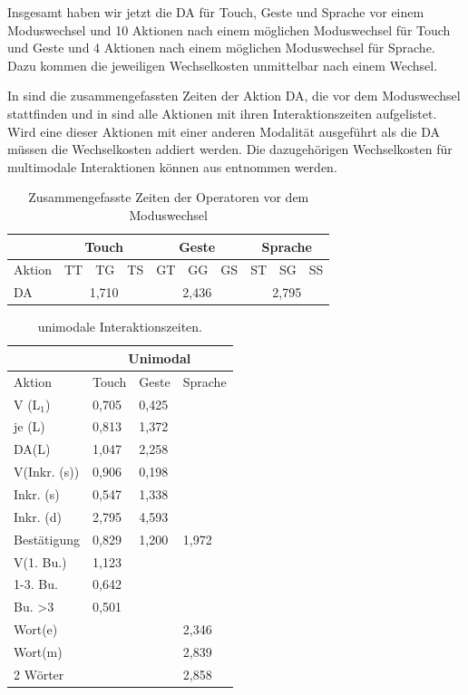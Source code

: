 Insgesamt haben wir jetzt die DA für Touch, Geste und Sprache vor einem Moduswechsel und 10 Aktionen nach einem möglichen Moduswechsel für Touch und Geste und 4 Aktionen nach einem möglichen Moduswechsel für Sprache. Dazu kommen die jeweiligen Wechselkosten unmittelbar nach einem Wechsel.

In  sind die zusammengefassten Zeiten der Aktion DA, die vor dem Moduswechsel stattfinden und in  sind alle Aktionen mit ihren Interaktionszeiten aufgelistet. Wird eine dieser Aktionen mit einer anderen Modalität ausgeführt als die DA müssen die Wechselkosten addiert werden.
Die dazugehörigen Wechselkosten für multimodale Interaktionen können aus  entnommen werden.
\begin{table}[ht]
  \centering
	\begin{tabular}{|l|l|l|l|l|l|l|l|l|l|}
		\hline
		& \multicolumn{3}{|c|}{Touch} & \multicolumn{3}{|c|}{Geste}&\multicolumn{3}{|c|}{Sprache}\\
		\hline
		Aktion 					& TT 		& TG 		& TS 		& GT 		& GG 		& GS 		& ST 		& SG 		& SS\\
		\hline
		DA 	& \multicolumn{3}{|c|}{1,710} &	\multicolumn{3}{|c|}{2,436} 	&	\multicolumn{3}{|c|}{2,795} \\
		\hline			
  \end{tabular}
	\caption{Zusammengefasste Zeiten der Operatoren vor dem Moduswechsel}
\label{tab:DA}
\end{table}
\begin{table}[ht]
  \centering
			\begin{tabular}{|l|l|l|l|}
					\hline
				& \multicolumn{3}{|c|}{Unimodal}\\
				\hline
				Aktion 					& Touch & Geste & Sprache \\
				\hline
				V (L$_1$) 		& {0,705} 	&	{0,425}	&	\\
				\hline
				je (L)				& {0,813} &	{1,372} &\\
				\hline
				DA(L)						& {1,047} &	{2,258} & \\
				\hline
				V(Inkr. (s))		& {0,906} &	{0,198} &\\
				\hline
				Inkr. (s)			& {0,547} &	{1,338} &\\
				\hline
				Inkr. (d)					& {2,795} &	4,593 & \\		
				\hline		
				Bestätigung 		& {0,829} &{1,200} & {1,972}\\			
				\hline
				V(1. Bu.)					& {1,123} 	& 	&\\
				\hline	
				1-3. Bu.					& {0,642} & 	& \\
				\hline		
				Bu. >3 					& {0,501}		&  	& \\
				\hline	
				Wort(e)					& & & {2,346} \\
				\hline		
				Wort(m) 				& & & {2,839}\\
				\hline
				2 Wörter 				& & & {2,858}\\
				\hline
			\end{tabular}
	\caption{unimodale Interaktionszeiten.}
	\label{tab:AktionenUnimodal}
\end{table}
